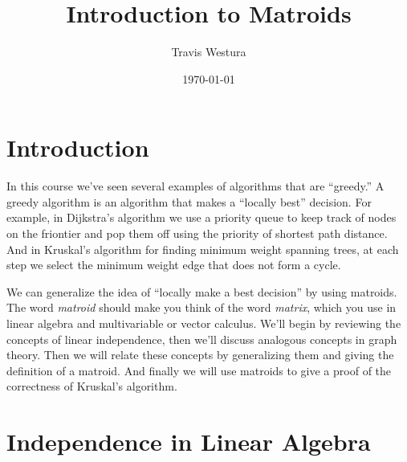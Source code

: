 \documentclass[twoside]{article}
\title{Introduction to Matroids}
\author{Travis Westura}
\date{\today}
\begin{document}
\maketitle
\thispagestyle{empty}

\section{Introduction}

In this course we've seen several examples of algorithms that are ``greedy.''
A greedy algorithm is an algorithm that makes a ``locally best'' decision.
For example, in Dijkstra's algorithm we use a priority queue to keep track of nodes on the friontier and pop them off using the priority of shortest path distance.
And in Kruskal's algorithm for finding minimum weight spanning trees, at each step we select the minimum weight edge that does not form a cycle.

We can generalize the idea of ``locally make a best decision'' by using matroids.
The word \emph{matroid} should make you think of the word \emph{matrix}, which you use in linear algebra and multivariable or vector calculus.
We'll begin by reviewing the concepts of linear independence, then we'll discuss analogous concepts in graph theory.
Then we will relate these concepts by generalizing them and giving the definition of a matroid.
And finally we will use matroids to give a proof of the correctness of Kruskal's algorithm.

\section{Independence in Linear Algebra}
\end{document}
